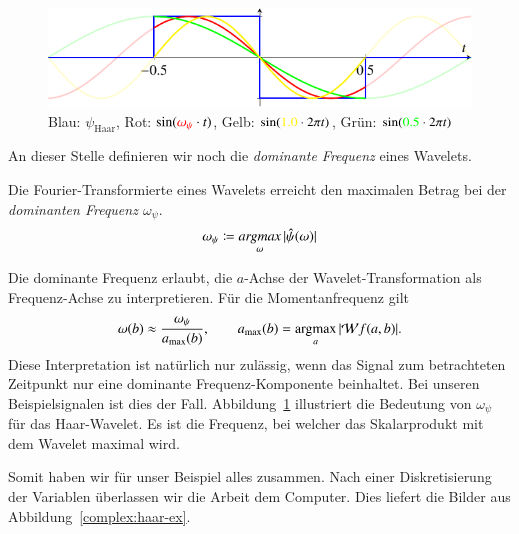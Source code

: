 \begin{figure}
	\centering
	\includegraphics{papers/complex/images/haar_dom.pdf}
	
	\caption{Blau: $\psi_\text{Haar}$, Rot: $\sin ({\color{red}\omega_\psi}\cdot t)$, Gelb: $\sin ({\color{yellow}1.0}\cdot 2\pi t)$, Grün: $\sin ({\color{green}0.5}\cdot 2\pi t)$}
	\label{complex:dom-freq}
\end{figure}
An dieser Stelle definieren wir noch die \emph{dominante Frequenz} eines Wavelets.
%
\begin{definition}
	Die Fourier-Transformierte eines Wavelets erreicht den maximalen Betrag bei der \emph{dominanten Frequenz $\omega_\psi$}.
	\begin{equation}
		\omega_\psi \coloneqq \underset{\omega}{\text{\emph{argmax}}} \, |\hat\psi(\omega)|
	\end{equation}
	
\end{definition}

Die dominante Frequenz erlaubt, die $a$-Achse der Wavelet-Transformation als Frequenz-Achse zu interpretieren.
Für die Momentanfrequenz gilt
\[
	\omega(b) \approx \frac{\omega_\psi}{a_\text{max}(b)},
	\qquad 
	a_\text{max}(b)
	= 
	\underset{a}{\text{argmax}} \, |\!\Wave f(a,b)|.
\]
Diese Interpretation ist natürlich nur zulässig, wenn das Signal zum betrachteten Zeitpunkt nur eine dominante Frequenz-Komponente beinhaltet.
Bei unseren Beispielsignalen ist dies der Fall.
Abbildung~\ref{complex:dom-freq} illustriert die Bedeutung von $\omega_\psi$ für das Haar-Wavelet.
Es ist die Frequenz, bei welcher das Skalarprodukt mit dem Wavelet maximal wird.

Somit haben wir für unser Beispiel alles zusammen.
Nach einer Diskretisierung der Variablen überlassen wir die Arbeit dem Computer.
Dies liefert die Bilder aus Abbildung~\ref{complex:haar-ex}.

